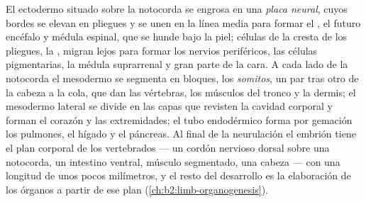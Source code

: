 \begin{proposition}\label{prop:b2:vertebrate-development:neurulation}
El ectodermo situado sobre la notocorda se engrosa en una \emph{placa
neural}, cuyos bordes se elevan en pliegues y se unen en la línea media
para formar el \emph{}, el futuro encéfalo y médula espinal,
que se hunde bajo la piel; células de la cresta de los pliegues, la
\emph{}, migran lejos para formar los nervios periféricos,
las células pigmentarias, la médula suprarrenal y gran parte de la cara.
A cada lado de la notocorda el mesodermo se segmenta en bloques, los
\emph{somitos}, un par tras otro de la cabeza a la cola, que dan las
vértebras, los músculos del tronco y la dermis; el mesodermo lateral se
divide en las capas que revisten la cavidad corporal y forman el corazón
y las extremidades; el tubo endodérmico forma por gemación los pulmones,
el hígado y el páncreas. Al final de la neurulación el embrión tiene el
plan corporal de los vertebrados --- un cordón nervioso dorsal sobre una
notocorda, un intestino ventral, músculo segmentado, una cabeza --- con
una longitud de unos pocos milímetros, y el resto del desarrollo es la
elaboración de los órganos a partir de ese plan
(\cref{ch:b2:limb-organogenesis}).
\end{proposition}

